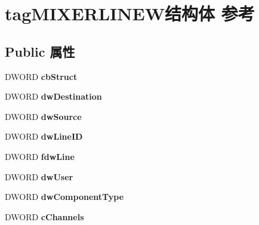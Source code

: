 \hypertarget{structtag_m_i_x_e_r_l_i_n_e_w}{}\section{tag\+M\+I\+X\+E\+R\+L\+I\+N\+E\+W结构体 参考}
\label{structtag_m_i_x_e_r_l_i_n_e_w}
\subsection*{Public 属性}
\begin{DoxyCompactItemize}
\item 
\mbox{\label{structtag_m_i_x_e_r_l_i_n_e_w_af91087e0a4c952bdce41b02ded2cb21b}} 
D\+W\+O\+RD {\bfseries cb\+Struct}
\item 
\mbox{\label{structtag_m_i_x_e_r_l_i_n_e_w_a4daa39cebb80b53f4c27d1884d638ddc}} 
D\+W\+O\+RD {\bfseries dw\+Destination}
\item 
\mbox{\label{structtag_m_i_x_e_r_l_i_n_e_w_a794eceda9a15d21c4fb91ec1259caa9e}} 
D\+W\+O\+RD {\bfseries dw\+Source}
\item 
\mbox{\label{structtag_m_i_x_e_r_l_i_n_e_w_a9709965001c024448d97cd3d72d2c138}} 
D\+W\+O\+RD {\bfseries dw\+Line\+ID}
\item 
\mbox{\label{structtag_m_i_x_e_r_l_i_n_e_w_a3aebaa404e6edd753274e010d793df5f}} 
D\+W\+O\+RD {\bfseries fdw\+Line}
\item 
\mbox{\label{structtag_m_i_x_e_r_l_i_n_e_w_ab249f5706de1657134eb9d06ab626676}} 
D\+W\+O\+RD {\bfseries dw\+User}
\item 
\mbox{\label{structtag_m_i_x_e_r_l_i_n_e_w_afad6b870f6d3100a199cfec26a387e9c}} 
D\+W\+O\+RD {\bfseries dw\+Component\+Type}
\item 
\mbox{\label{structtag_m_i_x_e_r_l_i_n_e_w_ab16ad9f07f2f0ee2ad92192d45a1f630}} 
D\+W\+O\+RD {\bfseries c\+Channels}
\item 
\mbox{\label{structtag_m_i_x_e_r_l_i_n_e_w_ab30dbfff99e6eec194df329996ba288e}} 

\end{DoxyCompactItemize}
